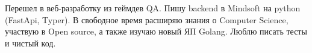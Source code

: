 \documentclass[a4paper, 12pt]{article}
\begin{document}
\setlength\parindent{.3in}

Перешел в веб-разработку из геймдев QA. Пишу backend в Mindsoft на python (FastApi, Typer).
В свободное время расширяю знания о Computer Science, участвую в Open source, а также изучаю новый ЯП Golang.
Люблю писать тесты и чистый код.
\end{document}
